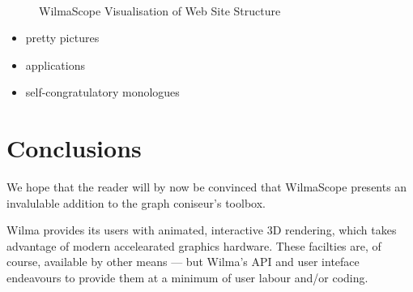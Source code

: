 \documentclass[runningheads]{cl2emult}
\begin{document}
\begin{figure}
\begin{center}
 \\
\caption{{\sc WilmaScope Visualisation of Web Site Structure}}
\label{fig-web}
\end{center}
\end{figure}

\begin{itemize}
\item pretty pictures
\item applications
\item self-congratulatory monologues
\end{itemize}

\section{Conclusions}
\label{sec:conclusions}

We hope that the reader will by now be convinced that WilmaScope presents an
invalulable addition to the graph coniseur's toolbox.  

Wilma provides its users with animated, interactive 3D rendering, which takes
advantage of modern accelearated graphics hardware.  These facilties are, of
course, available by other means --- but Wilma's API and user inteface
endeavours to provide them at a minimum of user labour and/or coding.
\end{document}
